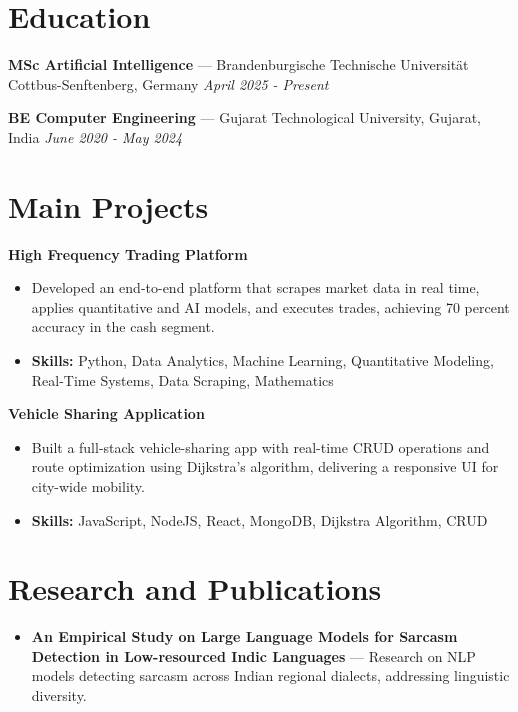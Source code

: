 \documentclass[a4paper,10pt]{article}
\begin{document}
\section*{Education}
\textbf{MSc Artificial Intelligence} — Brandenburgische Technische Universität Cottbus-Senftenberg, Germany \hfill \textit{April 2025 - Present}\par
\vspace{1.5pt}
\textbf{BE Computer Engineering} — Gujarat Technological University, Gujarat, India \hfill \textit{June 2020 - May 2024}\par

\section*{Main Projects}
\textbf{High Frequency Trading Platform}\par
\vspace{1pt}
\begin{itemize}
  \item Developed an end-to-end platform that scrapes market data in real time, applies quantitative and AI models, and executes trades, achieving 70 percent accuracy in the cash segment.
  \item \textbf{Skills:} Python, Data Analytics, Machine Learning, Quantitative Modeling, Real-Time Systems, Data Scraping, Mathematics
\end{itemize}
\vspace{3pt}
\textbf{Vehicle Sharing Application}\par
\vspace{1pt}
\begin{itemize}
  \item Built a full-stack vehicle-sharing app with real-time CRUD operations and route optimization using Dijkstra's algorithm, delivering a responsive UI for city-wide mobility.
  \item \textbf{Skills:} JavaScript, NodeJS, React, MongoDB, Dijkstra Algorithm, CRUD
\end{itemize}

\section*{Research and Publications}
\begin{itemize}
\item \textbf{An Empirical Study on Large Language Models for Sarcasm Detection in Low-resourced Indic Languages} — Research on NLP models detecting sarcasm across Indian regional dialects, addressing linguistic diversity.
\end{itemize}
\end{document}

